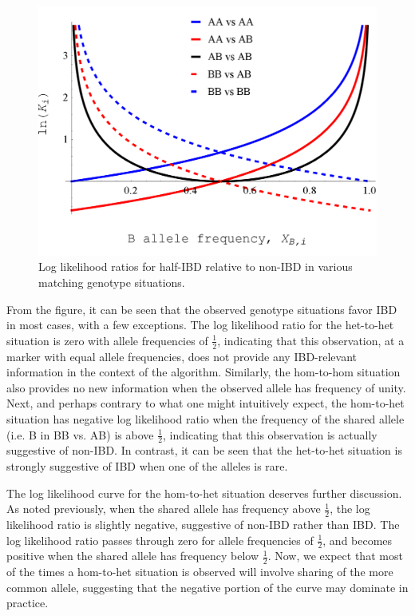 \documentclass{article}
\begin{document}
\begin{figure}[h!]
\noindent
\centering
\includegraphics[scale=0.20]{llrs_rev2c}
\caption{Log likelihood ratios for half-IBD relative to non-IBD in various matching genotype situations.}
\label{fig:llrs}
\end{figure}

From the figure, it can be seen that the observed genotype situations favor IBD in most cases, with a few exceptions. The log likelihood ratio for the het-to-het situation is zero with allele frequencies of $\frac{1}{2}$, indicating that this observation, at a marker with equal allele frequencies, does not provide any IBD-relevant information in the context of the algorithm. Similarly, the hom-to-hom situation also provides no new information when the observed allele has frequency of unity. Next, and perhaps contrary to what one might intuitively expect, the hom-to-het situation has negative log likelihood ratio when the frequency of the shared allele (i.e. B in BB vs. AB) is above $\frac{1}{2}$, indicating that this observation is actually suggestive of non-IBD. In contrast, it can be seen that the het-to-het situation is strongly suggestive of IBD when one of the alleles is rare.

The log likelihood curve for the hom-to-het situation deserves further discussion. As noted previously, when the shared allele has frequency above $\frac{1}{2}$, the log likelihood ratio is slightly negative, suggestive of non-IBD rather than IBD. The log likelihood ratio passes through zero for allele frequencies of $\frac{1}{2}$, and becomes positive when the shared allele has frequency below $\frac{1}{2}$. Now, we expect that most of the times a hom-to-het situation is observed will involve sharing of the more common allele, suggesting that the negative portion of the curve may dominate in practice. 
\end{document}
